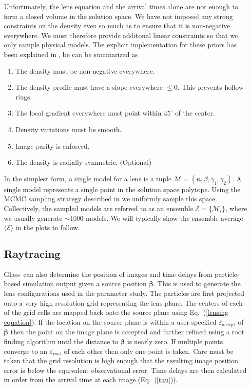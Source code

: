 \documentclass[onecolumn,galley]{mn2e}
\newcommand{\Glass}{{\sc Glass}}
\newcommand{\M}{\ensuremath{\mathscr{M}}}
\newcommand{\E}{\ensuremath{\mathscr{E}}}
\newcommand{\eps}{\ensuremath{\varepsilon}}
\newcommand{\Eavg}{\ensuremath{\langle \E \rangle}}
\newcommand{\eqnref}[1] {Eq.~(\ref{#1})}
\renewcommand{\vec}[1]{\ensuremath{\boldsymbol{#1}}}
\begin{document}
Unfortunately, the lens equation and the arrival times alone are not enough to form a
closed volume in the solution space. We have not imposed any strong constraints
on the density even so much as to ensure that it is non-negative everywhere. We
must therefore provide additonal linear constraints so that we only sample
physical models. The explicit implementation for these priors has been
explained in \cite{}, be can be summarized as
\begin{enumerate}
\item The density must be non-negative everywhere.
\item The density profile must have a slope everywhere $\le 0$. This prevents hollow rings.
\item The local gradient everywhere must point within $45^{\circ}$ of the center.
\item Density variations must be smooth.
\item Image parity is enforced.
\item The density is radially symmetric. (Optional)
\end{enumerate}

In the simplest form, a single model for a lens is a tuple $\M = (\vec\kappa,
\beta, \gamma_1, \gamma_2)$. A single model represents a single point in the
solution space polytope. Using the MCMC sampling strategy described in \cite{}
we uniformly sample this space. Collectively, the sampled models are referred
to as an ensemble $\E = \{\M_i\}$, where we usually generate $\sim$1000 models. We
will typically show the ensemble average $\Eavg$ in the plots to
follow.



\subsection{Raytracing}
\label{Raytracing}
\Glass\ can also determine the position of images and time delays from 
particle-based simulation output given a source position $\vec\beta$. This is
used to generate the lens configurations used in the parameter study.  The
particles are first projected onto a very high resolution grid representing the
lens plane. The centers of each of the grid cells are mapped back onto the
source plane using \eqnref{lensing equation}. If the location on the source
plane is within a user specified $\eps_\mathrm{accept}$ of $\vec\beta$ then the
point on the image plane is accepted and further refined using a root finding
algorithm until the distance to $\vec\beta$ is nearly zero. If multiple points
converge to an $\eps_\mathrm{root}$ of each other then only one point is taken.
Care must be taken that the grid resolution is high enough that the resulting
image position error is below the equivalent observational error. Time delays
are then calculated in order from the arrival time at each image (\eqnref{tau}).
\end{document}
